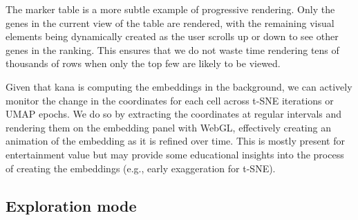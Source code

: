 \documentclass{article}
\begin{document}
The marker table is a more subtle example of progressive rendering.
Only the genes in the current view of the table are rendered, with the remaining visual elements being dynamically created as the user scrolls up or down to see other genes in the ranking.
This ensures that we do not waste time rendering tens of thousands of rows when only the top few are likely to be viewed.

Given that kana is computing the embeddings in the background, we can actively monitor the change in the coordinates for each cell across t-SNE iterations or UMAP epochs.
We do so by extracting the coordinates at regular intervals and rendering them on the embedding panel with WebGL,
effectively creating an animation of the embedding as it is refined over time.
This is mostly present for entertainment value but may provide some educational insights into the process of creating the embeddings (e.g., early exaggeration for t-SNE).

\subsection{Exploration mode}


% 
\end{document}
